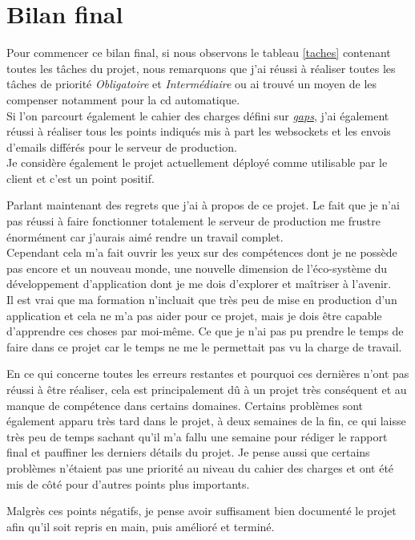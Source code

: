 \documentclass[
    iai, %
    il, %
]{heig-tb}
\begin{document}
\section{Bilan final}
Pour commencer ce bilan final, si nous observons le tableau \ref{taches} contenant toutes les tâches du projet, nous remarquons que j'ai réussi à réaliser toutes les tâches de priorité \emph{Obligatoire} et \emph{Intermédiaire} ou ai trouvé un moyen de les compenser notamment pour la \Gls{cd} automatique. \\
Si l'on parcourt également le cahier des charges défini sur \href{https://gaps.heig-vd.ch/consultation/diplome/affichage.php?id=6135&mode=HTML}{\emph{gaps}}, j'ai également réussi à réaliser tous les points indiqués mis à part les \Gls{websockets} et les envois d'emails différés pour le serveur de production.\\
Je considère également le projet actuellement déployé comme utilisable par le client et c'est un point positif.

Parlant maintenant des regrets que j'ai à propos de ce projet. Le fait que je n'ai pas réussi à faire fonctionner totalement le serveur de production me frustre énormément car j'aurais aimé rendre un travail complet. \\
Cependant cela m'a fait ouvrir les yeux sur des compétences dont je ne possède pas encore et un nouveau monde, une nouvelle dimension de l'éco-système du développement d'application dont je me dois d'explorer et maîtriser à l'avenir. \\
Il est vrai que ma formation n'incluait que très peu de mise en production d'un application et cela ne m'a pas aider pour ce projet, mais je dois être capable d'apprendre ces choses par moi-même. Ce que je n'ai pas pu prendre le temps de faire dans ce projet car le temps ne me le permettait pas vu la charge de travail.

En ce qui concerne toutes les erreurs restantes et pourquoi ces dernières n'ont pas réussi à être réaliser, cela est principalement dû à un projet très conséquent et au manque de compétence dans certains domaines. Certains problèmes sont également apparu très tard dans le projet, à deux semaines de la fin, ce qui laisse très peu de temps sachant qu'il m'a fallu une semaine pour rédiger le rapport final et pauffiner les derniers détails du projet. Je pense aussi que certains problèmes n'étaient pas une priorité au niveau du cahier des charges et ont été mis de côté pour d'autres points plus importants.

Malgrès ces points négatifs, je pense avoir suffisament bien documenté le projet afin qu'il soit repris en main, puis amélioré et terminé.
\end{document}
